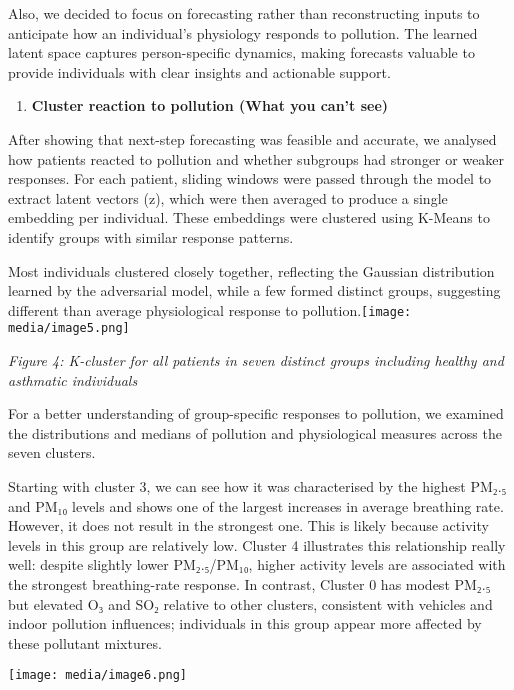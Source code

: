\documentclass[
]{article}
\begin{document}
Also, we decided to focus on forecasting rather than reconstructing
inputs to anticipate how an individual's physiology responds to
pollution. The learned latent space captures person-specific dynamics,
making forecasts valuable to provide individuals with clear insights and
actionable support.

\begin{enumerate}
\def\labelenumi{\arabic{enumi}.}
\setcounter{enumi}{1}
\item
  \textbf{Cluster reaction to pollution (What you can't see)}
\end{enumerate}

After showing that next-step forecasting was feasible and accurate, we
analysed how patients reacted to pollution and whether subgroups had
stronger or weaker responses. For each patient, sliding windows were
passed through the model to extract latent vectors (z), which were then
averaged to produce a single embedding per individual. These embeddings
were clustered using K-Means to identify groups with similar response
patterns.

Most individuals clustered closely together, reflecting the Gaussian
distribution learned by the adversarial model, while a few formed
distinct groups, suggesting different than average physiological
response to
pollution.\texttt{[image: media/image5.png]}

\emph{Figure 4: K-cluster for all patients in seven distinct groups
including healthy and asthmatic individuals}

For a better understanding of group-specific responses to pollution, we
examined the distributions and medians of pollution and physiological
measures across the seven clusters.

Starting with cluster 3, we can see how it was characterised by the
highest PM₂.₅ and PM₁₀ levels and shows one of the largest increases in
average breathing rate. However, it does not result in the strongest
one. This is likely because activity levels in this group are relatively
low. Cluster 4 illustrates this relationship really well: despite
slightly lower PM₂.₅/PM₁₀, higher activity levels are associated with
the strongest breathing-rate response. In contrast, Cluster 0 has modest
PM₂.₅ but elevated O₃ and SO₂ relative to other clusters, consistent
with vehicles and indoor pollution influences; individuals in this group
appear more affected by these pollutant mixtures.

\texttt{[image: media/image6.png]}
\end{document}
